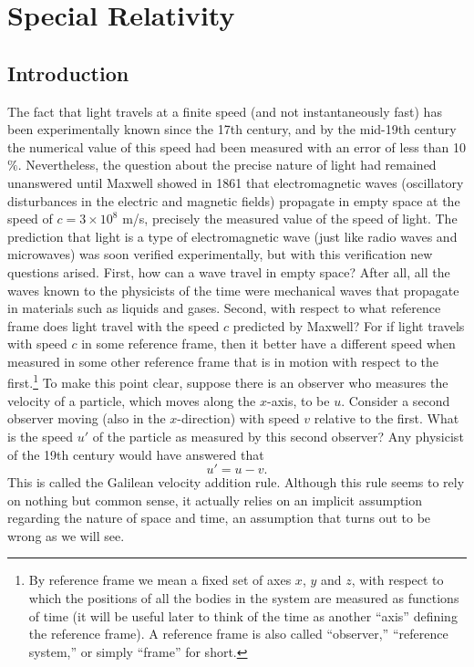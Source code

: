 \documentclass[11pt, a4paper,oneside,openright]{book}
\numberwithin{equation}{section}
\begin{document}
\chapter{Special Relativity}

\section{Introduction}

The fact that light travels at a finite speed (and not instantaneously fast) has been experimentally known since the 17th century, and by the mid-19th century the numerical value of this speed had been measured with an error of less than 10$\%$. Nevertheless, the question about the precise nature of light had remained unanswered until Maxwell showed in 1861 that electromagnetic waves (oscillatory disturbances in the electric and magnetic fields) propagate in empty space at the speed of $c=3\times10^8$ m/s, precisely the measured value of the speed of light. The prediction that light is a type of electromagnetic wave (just like radio waves and microwaves) was soon verified experimentally, but with this verification new questions arised. First, how can a wave travel in empty space? After all, all the waves known to the physicists of the time were mechanical waves that propagate in materials such as liquids and gases. Second, with respect to what reference frame does light travel with the speed $c$ predicted by 
Maxwell? For if light travels with speed $c$ in some reference frame, then it better have a different speed when measured in some other reference frame that is in motion with respect to the first.\footnote{By reference frame we mean a fixed set of axes $x$, $y$ and $z$, with respect to which the positions of all the bodies in the system are measured as functions of time (it will be useful later to think of the time as another ``axis'' defining the reference frame). A reference frame is also called ``observer,'' ``reference system,'' or simply ``frame'' for short.} To make this point clear, suppose there is an observer who measures the velocity of a particle, which moves along the $x$-axis, to be $u$. Consider a second observer moving (also in the $x$-direction) with speed $v$ relative to the first. What is the speed $u'$ of the particle as measured by this second observer? Any physicist of the 19th century would have answered that
\begin{equation} \label{eq:galilean_vel_rule}
u'=u-v.
\end{equation}
This is called the Galilean velocity addition rule. Although this rule seems to rely on nothing but common sense, it actually relies on an implicit assumption regarding the nature of space and time, an assumption that turns out to be wrong as we will see.
\end{document}
